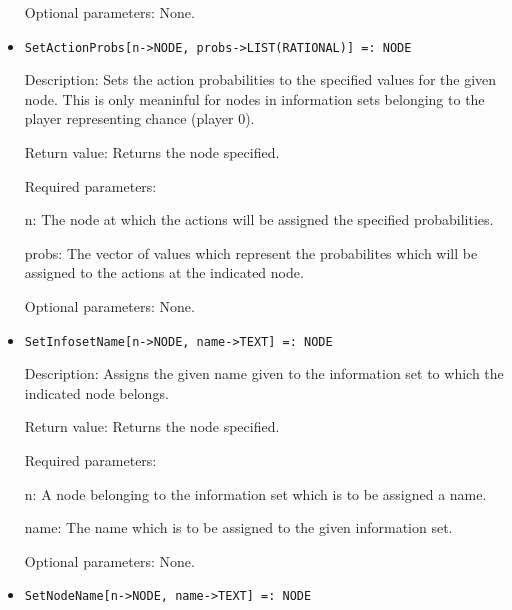\begin{itemize}
\item
[Optional parameters:] None.

\ed

\item

\protect \large \begin{verbatim}
SetActionProbs[n->NODE, probs->LIST(RATIONAL)] =: NODE
\end{verbatim}\normalsize

\bd
\item
[Description:] Sets the action probabilities to the specified values
for the given node.  This is only meaninful for nodes in information
sets belonging to the player representing chance (player 0).
\item
[Return value:] Returns the node specified.
\item
[Required parameters:]\hfil\null
	
\bd
\item
[n:] The node at which the actions will be assigned the specified
probabilities.
\item
[probs:] The vector of values which represent the probabilites which
will be assigned to the actions at the indicated node.
\ed

\item
[Optional parameters:] None.
\ed

\item

\protect \large \begin{verbatim}
SetInfosetName[n->NODE, name->TEXT] =: NODE
\end{verbatim}\normalsize

\bd
\item
[Description:] Assigns the given name given to the information set to
which the indicated node belongs.
\item
[Return value:] Returns the node specified.
\item
[Required parameters:]\hfil\null
	
\bd
\item
[n:] A node belonging to the information set which is to be assigned a
name.
\item
[name:] The name which is to be assigned to the given information set.
\ed

\item
[Optional parameters:] None.
\ed

\item

\protect \large \begin{verbatim}
SetNodeName[n->NODE, name->TEXT] =: NODE
\end{verbatim}\normalsize


\end{itemize}
